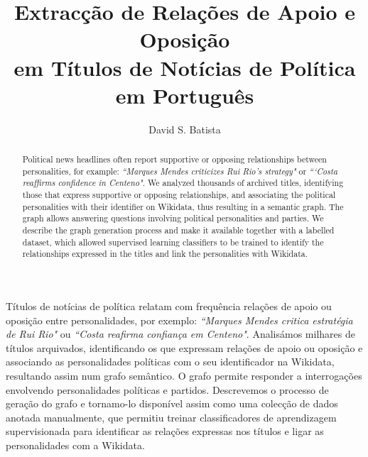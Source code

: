 \documentclass[a4paper, twocolumn, 11pt, twoside]{article}
\title{Extracção de Relações de Apoio e Oposição \\em Títulos de Notícias de Política em Português}
\author{
  David S. Batista \\
  \email{dsbatista@gmail.com} 
}
\begin{document}
\maketitle

\begin{resumo}
	
Títulos de notícias de política relatam com frequência relações de apoio ou oposição entre personalidades, por exemplo: \textit{``Marques Mendes critica estratégia de Rui Rio"} ou \textit{``Costa reafirma confiança em Centeno"}. Analisámos milhares de títulos arquivados, identificando os que expressam relações de apoio ou oposição e associando as personalidades políticas com o seu identificador na Wikidata, resultando assim num grafo semântico. O grafo permite responder a interrogações envolvendo personalidades políticas e partidos. Descrevemos o processo de geração do grafo e tornamo-lo disponível assim como uma colecção de dados anotada manualmente, que permitiu treinar classificadores de aprendizagem supervisionada para identificar as relações expressas nos títulos e ligar as personalidades com a Wikidata.
\end{resumo}


\begin{abstract}
Political news headlines often report supportive or opposing relationships between personalities, for example: \textit{``Marques Mendes criticizes Rui Rio's strategy"} or \textit{```Costa reaffirms confidence in Centeno"}. We analyzed thousands of archived titles, identifying those that express supportive or opposing relationships, and associating the political personalities with their identifier on Wikidata, thus resulting in a semantic graph. The graph allows answering questions involving political personalities and parties. We describe the graph generation process and make it available together with a labelled dataset, which allowed supervised learning classifiers to be trained to identify the relationships expressed in the titles and link the personalities with Wikidata.
\end{abstract}

\end{document}
